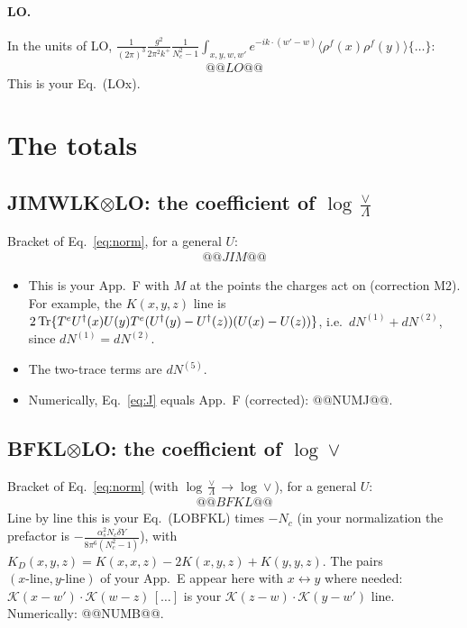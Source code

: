 \documentclass[10pt]{article}
\numberwithin{equation}{section}
\newcommand{\pre}{\frac{1}{(2\pi)^3}}
\begin{document}
\paragraph{LO.} In the units of LO, $\pre\frac{g^2}{2\pi^2k^+}\frac{1}{N_c^2-1}\int_{x,y,w,w'}e^{-ik\cdot(w'-w)}\langle\rho^f(x)\rho^f(y)\rangle\{\dots\}$:
\begin{align}
@@LO@@
\label{eq:LO}
\end{align}
This is your Eq.~(LOx).

\section{The totals}\label{sec:totals}
\subsection{JIMWLK\texorpdfstring{$\otimes$}{x}LO: the coefficient of \texorpdfstring{$\log\frac{\vee}{\Lambda}$}{log(vee/Lambda)}}
Bracket of Eq.~\eqref{eq:norm}, for a general $U$:
\begin{align}
@@JIM@@
\label{eq:J}
\end{align}
\begin{itemize}
\item This is your App.~F with $M$ at the points the charges act on (correction M2). For example, the $K(x,y,z)$ line is $2\,{\rm Tr}\{T^eU^\dagger(x)U(y)T^e(U^\dagger(y)-U^\dagger(z))(U(x)-U(z))\}$, i.e.\ $dN^{(1)}+dN^{(2)}$, since $dN^{(1)}=dN^{(2)}$.
\item The two-trace terms are $dN^{(5)}$.
\item Numerically, Eq.~\eqref{eq:J} equals App.~F (corrected): @@NUMJ@@.
\end{itemize}

\subsection{BFKL\texorpdfstring{$\otimes$}{x}LO: the coefficient of \texorpdfstring{$\log\vee$}{log vee}}
Bracket of Eq.~\eqref{eq:norm} (with $\log\frac\vee\Lambda\to\log\vee$), for a general $U$:
\begin{align}
@@BFKL@@
\label{eq:B}
\end{align}
Line by line this is your Eq.~(LOBFKL) times $-N_c$ (in your normalization the prefactor is $-\frac{\alpha_s^2N_c\delta Y}{8\pi^6(N_c^2-1)}$), with $K_D(x,y,z)=K(x,x,z)-2K(x,y,z)+K(y,y,z)$. The pairs $(x\text{-line},y\text{-line})$ of your App.~E appear here with $x\leftrightarrow y$ where needed: $\mathcal K(x-w')\cdot\mathcal K(w-z)\,[\dots]$ is your $\mathcal K(z-w)\cdot\mathcal K(y-w')$ line. Numerically: @@NUMB@@.
\end{document}
